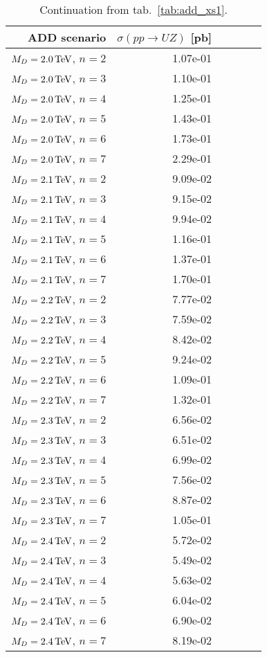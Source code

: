 \begin{table}[hbtp]
  \caption{
    Continuation from tab.~\ref{tab:add_xs1}.
  }
  \label{tab:add_xs2}
  \begin{center}
{\footnotesize
  \begin{tabular}{rrrrrr}
\hline 
ADD scenario              & $\sigma(pp\rightarrow UZ)$ [pb]\\
\hline

$M_{D} = 2.0 \,\text{Te\hspace{-.08em}V}$, $n=2$  & 1.07e-01 \\
$M_{D} = 2.0 \,\text{Te\hspace{-.08em}V}$, $n=3$  & 1.10e-01 \\
$M_{D} = 2.0 \,\text{Te\hspace{-.08em}V}$, $n=4$  & 1.25e-01 \\
$M_{D} = 2.0 \,\text{Te\hspace{-.08em}V}$, $n=5$  & 1.43e-01 \\
$M_{D} = 2.0 \,\text{Te\hspace{-.08em}V}$, $n=6$  & 1.73e-01 \\
$M_{D} = 2.0 \,\text{Te\hspace{-.08em}V}$, $n=7$  & 2.29e-01 \\
$M_{D} = 2.1 \,\text{Te\hspace{-.08em}V}$, $n=2$  & 9.09e-02 \\
$M_{D} = 2.1 \,\text{Te\hspace{-.08em}V}$, $n=3$  & 9.15e-02 \\
$M_{D} = 2.1 \,\text{Te\hspace{-.08em}V}$, $n=4$  & 9.94e-02 \\
$M_{D} = 2.1 \,\text{Te\hspace{-.08em}V}$, $n=5$  & 1.16e-01 \\
$M_{D} = 2.1 \,\text{Te\hspace{-.08em}V}$, $n=6$  & 1.37e-01 \\
$M_{D} = 2.1 \,\text{Te\hspace{-.08em}V}$, $n=7$  & 1.70e-01 \\
$M_{D} = 2.2 \,\text{Te\hspace{-.08em}V}$, $n=2$  & 7.77e-02 \\
$M_{D} = 2.2 \,\text{Te\hspace{-.08em}V}$, $n=3$  & 7.59e-02 \\
$M_{D} = 2.2 \,\text{Te\hspace{-.08em}V}$, $n=4$  & 8.42e-02 \\
$M_{D} = 2.2 \,\text{Te\hspace{-.08em}V}$, $n=5$  & 9.24e-02 \\
$M_{D} = 2.2 \,\text{Te\hspace{-.08em}V}$, $n=6$  & 1.09e-01 \\
$M_{D} = 2.2 \,\text{Te\hspace{-.08em}V}$, $n=7$  & 1.32e-01 \\
$M_{D} = 2.3 \,\text{Te\hspace{-.08em}V}$, $n=2$  & 6.56e-02 \\
$M_{D} = 2.3 \,\text{Te\hspace{-.08em}V}$, $n=3$  & 6.51e-02 \\
$M_{D} = 2.3 \,\text{Te\hspace{-.08em}V}$, $n=4$  & 6.99e-02 \\
$M_{D} = 2.3 \,\text{Te\hspace{-.08em}V}$, $n=5$  & 7.56e-02 \\
$M_{D} = 2.3 \,\text{Te\hspace{-.08em}V}$, $n=6$  & 8.87e-02 \\
$M_{D} = 2.3 \,\text{Te\hspace{-.08em}V}$, $n=7$  & 1.05e-01 \\
$M_{D} = 2.4 \,\text{Te\hspace{-.08em}V}$, $n=2$  & 5.72e-02 \\
$M_{D} = 2.4 \,\text{Te\hspace{-.08em}V}$, $n=3$  & 5.49e-02 \\
$M_{D} = 2.4 \,\text{Te\hspace{-.08em}V}$, $n=4$  & 5.63e-02 \\
$M_{D} = 2.4 \,\text{Te\hspace{-.08em}V}$, $n=5$  & 6.04e-02 \\
$M_{D} = 2.4 \,\text{Te\hspace{-.08em}V}$, $n=6$  & 6.90e-02 \\
$M_{D} = 2.4 \,\text{Te\hspace{-.08em}V}$, $n=7$  & 8.19e-02 \\\hline
  \end{tabular}
}
  \end{center}
\end{table}

